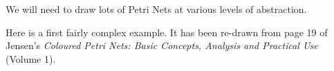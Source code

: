 

We will need to draw lots of Petri Nets at various levels of abstraction.

Here is a first fairly complex example. It has been re-drawn from page 19 of
Jensen's \emph{Coloured Petri Nets: Basic Concepts, Analysis and Practical Use}
(Volume 1).


